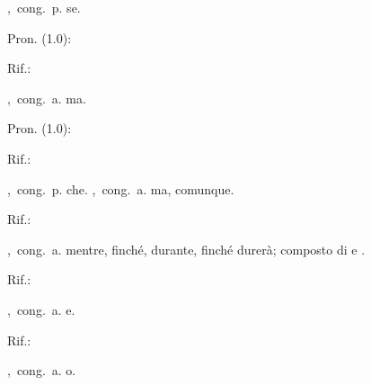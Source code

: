 ,\ cong.\ p.
se.
\begin{subvocedue}
\item[Pron. (1.0):] 
\item[Rif.:] 
\end{subvocedue}
,\ cong.\ a.
ma.
\begin{subvocedue}
\item[Pron. (1.0):] 
\item[Rif.:] 
\end{subvocedue}
,\ cong.\ p.
che.
,\ cong.\ a.
ma, comunque.
\begin{subvocedue}
\item[Rif.:] 
\end{subvocedue}
,\ cong.\ a.
mentre, finché, durante, finché durerà; composto di  e .
\begin{subvocedue}
\item[Rif.:] 
\end{subvocedue}
,\ cong.\ a.
e.
\begin{subvocedue}
\item[Rif.:] 
\end{subvocedue}
,\ cong.\ a.
o.

